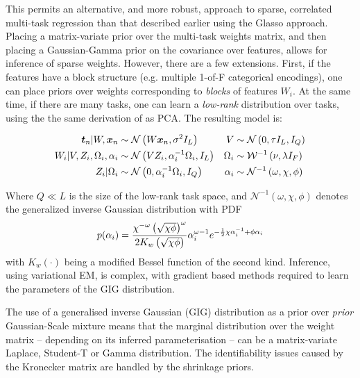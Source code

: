 This permits an alternative, and more robust,  approach to sparse, correlated multi-task regression than that described earlier using the Glasso approach. Placing a matrix-variate prior over the multi-task weights matrix, and then placing a Gaussian-Gamma prior on the covariance over features, allows for inference of sparse weights. However, there are a few extensions. First, if the features have a block structure (e.g. multiple 1-of-F categorical encodings), one can place priors over weights corresponding to \emph{blocks} of features $W_i$. At the same time, if there are many tasks, one can learn a \emph{low-rank} distribution over tasks, using the the same derivation of as PCA. The resulting model\cite{Archambeau2011} is:

\begin{align}
\bm t_n|W,\bm x_n & \sim \mathcal{N} \left( {W\bm x_n}, {\sigma^2 I_L} \right) &
V & \sim \mathcal{N} \left(0, \tau I_L, I_Q\right) \\
W_i | V, Z_i, \Omega_i,\alpha_i & \sim \mathcal{N} \left(VZ_i, \alpha_i^{-1} \Omega_i, I_L\right) &
\Omega_i & \sim \mathcal{W}^{-1}\left(\nu, \lambda I_F \right) \\
Z_i | \Omega_i & \sim \mathcal{N} \left(0, \alpha_i^{-1} \Omega_i, I_Q\right) &
\alpha_i & \sim\mathcal{N}^{-1}\left(\omega, \chi, \phi\right)
\end{align}

Where $Q \ll L$ is the size of the low-rank task space, and $\mathcal{N}^{-1}\left(\omega, \chi, \phi\right)$ denotes the generalized inverse Gaussian distribution with PDF
\begin{align}
p(\alpha_i) = \frac{\chi^{-\omega}\left(\sqrt{\chi \phi}\right)^\omega}{2 K_w \left(\sqrt{\chi \phi}\right)} \alpha_i^{\omega-1} e^{-\frac{1}{2} \chi \alpha_i^{-1} + \phi \alpha_i}
\end{align}
with $K_w(\cdot)$ being a modified Bessel function of the second kind. Inference, using variational EM, is complex, with gradient based methods required to learn the parameters of the GIG distribution.

The use of a generalised inverse Gaussian (GIG) distribution as a prior over \emph{prior} Gaussian-Scale mixture means that the marginal distribution over the weight matrix -- depending on its inferred parameterisation -- can be a matrix-variate Laplace, Student-T or Gamma distribution. The identifiability issues caused by the Kronecker matrix are handled by the shrinkage priors.

